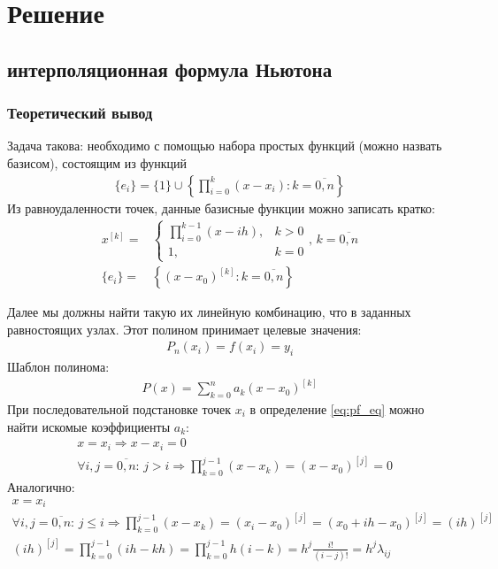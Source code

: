 \section{Решение}
\subsection{ интерполяционная формула Ньютона}
\subsubsection{Теоретический вывод}
Задача такова: необходимо с помощью набора простых функций (можно назвать базисом), состоящим из функций
\begin{align}
	\{e_i\}	= \{1\} \cup \left\{\prod_{i=0}^k (x - x_i)\colon k=\overline{0,n}\right\}
\end{align}
Из равноудаленности точек, данные базисные функции можно записать кратко:
\begin{align}
	x^{[k]} = & \begin{cases}
		            \prod_{i=0}^{k - 1} (x - i h), & k > 0 \\
		            1,                             & k = 0
	            \end{cases},\, k = \overline{0,n}                    \\
	\{e_i\} = & \left\{ (x - x_0)^{[k]}\colon k = \overline{0,n} \right\}
\end{align}

Далее мы должны найти такую их линейную комбинацию, что в заданных равностоящих узлах. Этот полином принимает целевые значения:
\begin{align}\label{eq:pf_eq}
	P_n(x_i) = f(x_i) = y_i
\end{align}
Шаблон полинома:
\begin{align}
	P(x) = \sum_{k=0}^n a_k (x - x_0)^{[k]}
\end{align}
При последовательной подстановке точек $x_i$ в определение \cref{eq:pf_eq} можно найти искомые коэффициенты $a_k$:
\begin{align}
	 & x = x_i \Longrightarrow x - x_i = 0                                                                            \\
	 & \forall i,j = \overline{0,n}\colon\, j > i \Longrightarrow \prod_{k=0}^{j - 1} (x - x_k) = (x - x_0)^{[j]} = 0
\end{align}
Аналогично:
\begin{align}
	x            = x_i                   \\
	\forall i,j  = \overline{0,n}\colon\, j \leq i \Longrightarrow \prod_{k=0}^{j-1} (x - x_k)  = (x_i - x_0)^{[j]} =
	(x_0 + i h - x_0)^{[j]} = (ih)^{[j]} \\
	(ih)^{[j]} = \prod_{k=0}^{j-1} (ih - kh) = \prod_{k=0}^{j-1} h (i - k) = h^j \frac{i!}{(i-j)!} = h^j \lambda_{ij}
\end{align}

